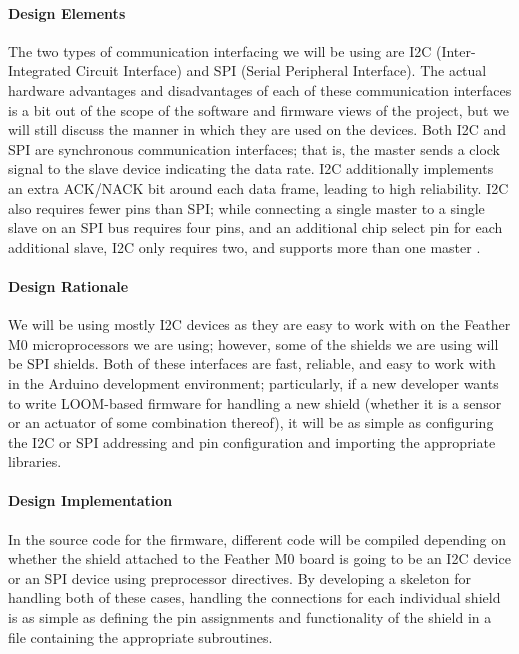\documentclass[onecolumn, draftclsnofoot,10pt, compsoc]{IEEEtran}
\begin{document}
\paragraph{Design Elements}
    The two types of communication interfacing we will be using are I2C (Inter-Integrated Circuit Interface) and SPI (Serial Peripheral Interface).  The actual hardware advantages and disadvantages of each of these communication interfaces is a bit out of the scope of the software and firmware views of the project, but we will still discuss the manner in which they are used on the devices. Both I2C and SPI are synchronous communication interfaces; that is, the master sends a clock signal to the slave device indicating the data rate. I2C additionally implements an extra ACK/NACK bit around each data frame, leading to high reliability. I2C also requires fewer pins than SPI; while connecting a single master to a single slave on an SPI bus requires four pins, and an additional chip select pin for each additional slave, I2C only requires two, and supports more than one master \cite{I2C} \cite{SPI}.

\paragraph{Design Rationale}
    We will be using mostly I2C devices as they are easy to work with on the Feather M0 microprocessors we are using; however, some of the shields we are using will be SPI shields. Both of these interfaces are fast, reliable, and easy to work with in the Arduino development environment; particularly, if a new developer wants to write LOOM-based firmware for handling a new shield (whether it is a sensor or an actuator of some combination thereof), it will be as simple as configuring the I2C or SPI addressing and pin configuration and importing the appropriate libraries.

\paragraph{Design Implementation}
    In the source code for the firmware, different code will be compiled depending on whether the shield attached to the Feather M0 board is going to be an I2C device or an SPI device using preprocessor directives. By developing a skeleton for handling both of these cases, handling the connections for each individual shield is as simple as defining the pin assignments and functionality of the shield in a file containing the appropriate subroutines.
\end{document}
